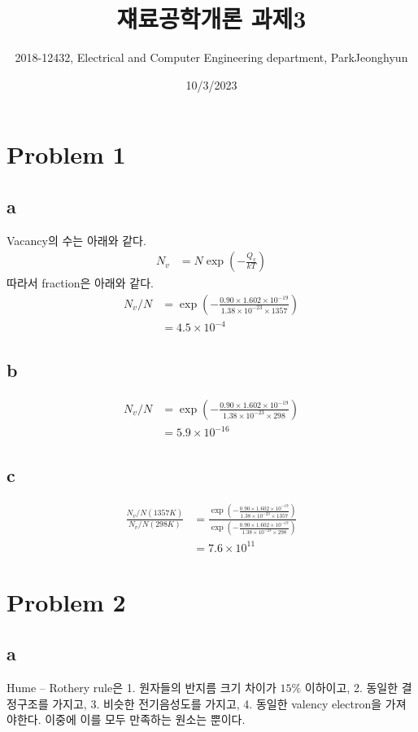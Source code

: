 \documentclass[a4paper]{oblivoir}
\title{쟤료공학개론 과제3}
\author{2018-12432, Electrical and Computer Engineering department, ParkJeonghyun}
\date{10/3/2023}
\begin{document}
\maketitle
\section{Problem 1}
\subsection{a}
Vacancy의 수는 아래와 같다.
\begin{align}
	N_{v} &= N\exp(-\frac{Q_{v}}{kT})
\end{align}
따라서 fraction은 아래와 같다.
\begin{align}
	N_{v}/N &= \exp(-\frac{0.90 \times 1.602 \times 10^{-19}}{1.38\times 10^{-23}\times 1357})\\
	&= 4.5\times 10^{-4}
\end{align}

\subsection{b}
\begin{align}
	N_{v}/N &= \exp(-\frac{0.90 \times 1.602 \times 10^{-19}}{1.38\times 10^{-23}\times 298})\\
	&= 5.9\times 10^{-16}
\end{align}

\subsection{c}
\begin{align}
	\frac{N_{v}/N(1357K)}{N_{v}/N(298K)} &= \frac{\exp(-\frac{0.90 \times 1.602 \times 10^{-19}}{1.38\times 10^{-23}\times 1357})}{\exp(-\frac{0.90 \times 1.602 \times 10^{-19}}{1.38\times 10^{-23}\times 298})}\\
	&= 7.6\times 10^{11}
\end{align}


\section{Problem 2}
\subsection{a}
Hume – Rothery rule은 1. 원자들의 반지름 크기 차이가 $15\%$ 이하이고, 2. 동일한 결정구조를 가지고, 3. 비슷한 전기음성도를 가지고, 4. 동일한 valency electron을 가져야한다. 이중에 이를 모두 만족하는 원소는 뿐이다.
\end{document}
